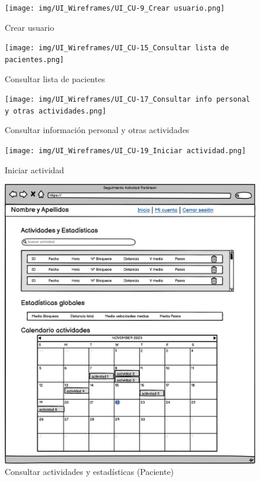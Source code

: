 \begin{figure}[h]
    \centering
    \texttt{[image: img/UI\_Wireframes/UI\_CU-9\_Crear usuario.png]}
    \caption{Crear usuario}
    \label{fig:Crear usuario}
\end{figure}

\begin{figure}[h]
    \centering
    \texttt{[image: img/UI\_Wireframes/UI\_CU-15\_Consultar lista de pacientes.png]}
    \caption{Consultar lista de pacientes}
    \label{fig:Consultar lista de pacientes}
\end{figure}

\begin{figure}[h]
    \centering
    \texttt{[image: img/UI\_Wireframes/UI\_CU-17\_Consultar info personal y otras actividades.png]}
    \caption{Consultar información personal y otras actividades}
    \label{fig:Consultar info personal y otras actividades}
\end{figure}

\begin{figure}[h]
    \centering
    \texttt{[image: img/UI\_Wireframes/UI\_CU-19\_Iniciar actividad.png]}
    \caption{Iniciar actividad}
    \label{fig:Iniciar actividad}
\end{figure}

\begin{figure}[h]
    \centering
    \includegraphics[width=1\textwidth]{img/UI_Wireframes/UI_CU-23_Pac-Consultar actividades y estadísticas (Alternate 323x) (Alternate 323x).png}
    \caption{Consultar actividades y estadísticas (Paciente)}
    \label{fig:Consultar actividades y estadísticas (Paciente)}
\end{figure}

